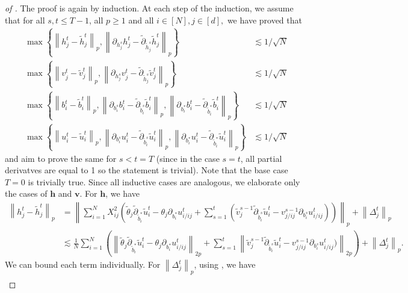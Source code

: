 \documentclass[10pt,a4paper]{amsart}
\newcommand{\bfh}{\boldsymbol{h}}
\newcommand{\bfv}{\boldsymbol{v}}
\newcommand{\norm}[1]{\left\lVert#1\right\rVert}
\begin{document}
\begin{proof}[of ]
      The proof is again by induction. At each step of the induction, we assume that for all $s,t\leq T-1$, all $p\geq 1$ and all $i\in [N],j\in [d],$ we have proved that
    \begin{align*}
        \max\left\{\norm{ h_j^t - \tilde{ h}_j^t}_p , \norm{\partial_{ h_j^s} h_j^t - \tilde{\partial}_{\tilde{ h}_j^s}\tilde{ h}_j^t}_p\right\}&\lesssim 1/\sqrt{N} \\
        \max\left\{\norm{ v_j^t - \tilde{ v}_j^t}_p , \norm{\partial_{ h_j^s} v_j^t - \tilde{\partial}_{\tilde{ h}_j^s}\tilde{ v}_j^t}_p\right\}&\lesssim 1/\sqrt{N} \\
        \max\left\{\norm{ b_i^t - \tilde{ b}_i^t}_p , \norm{\partial_{ b_i^s} b_i^t - \tilde{\partial}_{\tilde{ b}_i^s}\tilde{ b}_i^t}_p,\norm{\partial_{ b^*_i} b_i^t - \tilde{\partial}_{\tilde{ b}^*_i}\tilde{ b}_i^t}_p \right\}&\lesssim 1/\sqrt{N} \\
        \max\left\{\norm{ u_i^t - \tilde{ u}_i^t}_p , \norm{\partial_{ b_i^s} u_i^t - \tilde{\partial}_{\tilde{ b}_i^s}\tilde{ u}_i^t}_p,\norm{\partial_{ b_i^*} u_i^t - \tilde{\partial}_{\tilde{ b}^*_i}\tilde{ u}_i^t}_p \right\}&\lesssim 1/\sqrt{N}
    \end{align*}
    and aim to prove the same for $s<t=T$ (since in the case $s=t$, all partial derivatves are equal to 1 so the statement is trivial). Note that the base case $T=0$ is trivially true. Since all inductive cases are analogous, we elaborate only the cases of $\bfh$ and $\bfv.$ For $\bfh$, we have
    \begin{align*}
        \norm{h_j^t - \tilde{h}_j^t}_p &= \norm{\sum_{i=1}^N X_{ij}^2 \left(\tilde{\theta}_j \tilde{\partial}_{\tilde{b}_i^*} \tilde{u}_i^t - \theta_j \partial_{b_i^*}u_{i/ij}^t + \sum_{s=1}^t (\tilde{v}_j^{s-1} \tilde{\partial}_{\tilde{b}_i^s} \tilde{u}_i^t - v_{j/ij}^{s-1} \partial_{b_i^s}u_{i/ij}^t )\right)}_p + \norm{\Delta_j^t}_p \\
        &\lesssim  \frac{1}{N}\sum_{i=1}^N\left(\norm{ \tilde{\theta}_j \tilde{\partial}_{\tilde{b}_i^*} \tilde{u}_i^t - \theta_j \partial_{b_i^*}u_{i/ij}^t }_{2p}+ \sum_{s=1}^t \norm{\tilde{v}_j^{s-1} \tilde{\partial}_{\tilde{b}_i^s} \tilde{u}_i^t - v_{j/ij}^{s-1} \partial_{b_i^s}u_{i/ij}^t )}_{2p}\right) + \norm{\Delta_j^t}_p.
    \end{align*}
    We can bound each term individually. For $\norm{\Delta_j^t}_p$, using , we have 
    \begin{align*}

\end{align*}
\end{proof}
\end{document}
